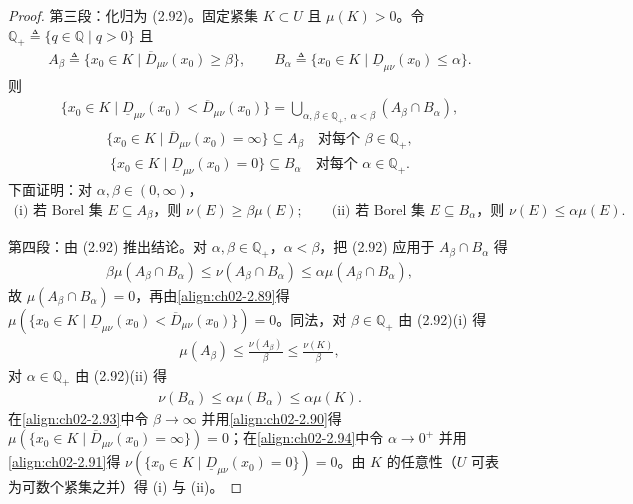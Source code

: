 \documentclass[../../main.tex]{subfiles}%
\begin{document}
\begin{proof}
第三段：化归为 (2.92)。固定紧集 $K\subset U$ 且 $\mu(K)>0$。令 $\mathbb{Q}_+\triangleq\{q\in\mathbb{Q}\mid q>0\}$ 且
\begin{align*}
A_\beta\triangleq\{x_0\in K\mid\overline{D}_{\mu\nu}(x_0)\geqslant\beta\},\qquad
B_\alpha\triangleq\{x_0\in K\mid\underline{D}_{\mu\nu}(x_0)\leqslant\alpha\}.
\end{align*}
则
\begin{align}
\{x_0\in K\mid\underline{D}_{\mu\nu}(x_0)<\overline{D}_{\mu\nu}(x_0)\}=\bigcup_{\alpha,\beta\in\mathbb{Q}_+,\ \alpha<\beta}(A_\beta\cap B_\alpha), \label{align:ch02-2.89}
\end{align}
\begin{align}
\{x_0\in K\mid\overline{D}_{\mu\nu}(x_0)=\infty\}\subseteq A_\beta\quad\text{对每个 }\beta\in\mathbb{Q}_+, \label{align:ch02-2.90}
\end{align}
\begin{align}
\{x_0\in K\mid\underline{D}_{\mu\nu}(x_0)=0\}\subseteq B_\alpha\quad\text{对每个 }\alpha\in\mathbb{Q}_+. \label{align:ch02-2.91}
\end{align}
下面证明：对 $\alpha,\beta\in(0,\infty)$，
\begin{align}
\text{(i) 若 Borel 集 }E\subseteq A_\beta\text{，则 }\nu(E)\geqslant\beta\mu(E);\qquad
\text{(ii) 若 Borel 集 }E\subseteq B_\alpha\text{，则 }\nu(E)\leqslant\alpha\mu(E). \label{align:ch02-2.92}
\end{align}

第四段：由 (2.92) 推出结论。对 $\alpha,\beta\in\mathbb{Q}_+$，$\alpha<\beta$，把 (2.92) 应用于 $A_\beta\cap B_\alpha$ 得
\begin{align*}
\beta\mu(A_\beta\cap B_\alpha)\leqslant\nu(A_\beta\cap B_\alpha)\leqslant\alpha\mu(A_\beta\cap B_\alpha),
\end{align*}
故 $\mu(A_\beta\cap B_\alpha)=0$，再由\eqref{align:ch02-2.89}得 $\mu(\{x_0\in K\mid\underline{D}_{\mu\nu}(x_0)<\overline{D}_{\mu\nu}(x_0)\})=0$。同法，对 $\beta\in\mathbb{Q}_+$ 由 (2.92)(i) 得
\begin{align}
\mu(A_\beta)\leqslant\frac{\nu(A_\beta)}{\beta}\leqslant\frac{\nu(K)}{\beta}, \label{align:ch02-2.93}
\end{align}
对 $\alpha\in\mathbb{Q}_+$ 由 (2.92)(ii) 得
\begin{align}
\nu(B_\alpha)\leqslant\alpha\mu(B_\alpha)\leqslant\alpha\mu(K). \label{align:ch02-2.94}
\end{align}
在\eqref{align:ch02-2.93}中令 $\beta\to\infty$ 并用\eqref{align:ch02-2.90}得 $\mu(\{x_0\in K\mid\overline{D}_{\mu\nu}(x_0)=\infty\})=0$；在\eqref{align:ch02-2.94}中令 $\alpha\to0^+$ 并用\eqref{align:ch02-2.91}得 $\nu(\{x_0\in K\mid\underline{D}_{\mu\nu}(x_0)=0\})=0$。由 $K$ 的任意性（$U$ 可表为可数个紧集之并）得 (i) 与 (ii)。


\end{proof}
\end{document}
